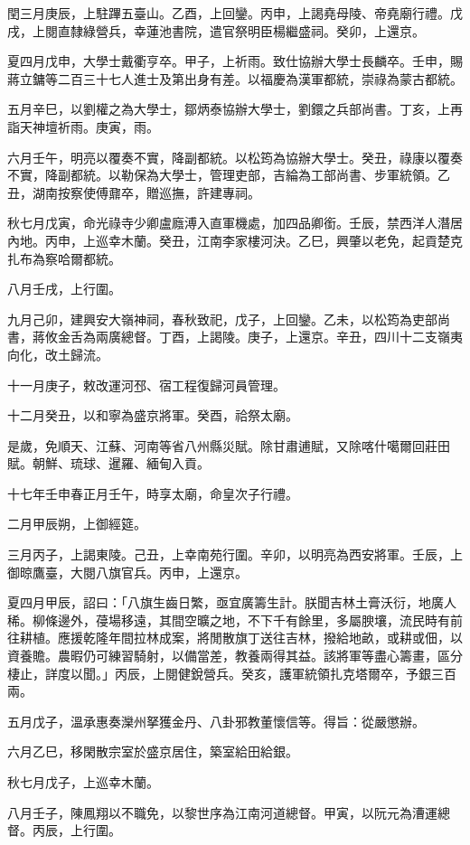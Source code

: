 \begin{pinyinscope}
閏三月庚辰，上駐蹕五臺山。乙酉，上回鑾。丙申，上謁堯母陵、帝堯廟行禮。戊戌，上閱直隸綠營兵，幸蓮池書院，遣官祭明臣楊繼盛祠。癸卯，上還京。

夏四月戊申，大學士戴衢亨卒。甲子，上祈雨。致仕協辦大學士長麟卒。壬申，賜蔣立鏞等二百三十七人進士及第出身有差。以福慶為漢軍都統，崇祿為蒙古都統。

五月辛巳，以劉權之為大學士，鄒炳泰協辦大學士，劉鐶之兵部尚書。丁亥，上再詣天神壇祈雨。庚寅，雨。

六月壬午，明亮以覆奏不實，降副都統。以松筠為協辦大學士。癸丑，祿康以覆奏不實，降副都統。以勒保為大學士，管理吏部，吉綸為工部尚書、步軍統領。乙丑，湖南按察使傅鼐卒，贈巡撫，許建專祠。

秋七月戊寅，命光祿寺少卿盧廕溥入直軍機處，加四品卿銜。壬辰，禁西洋人潛居內地。丙申，上巡幸木蘭。癸丑，江南李家樓河決。乙巳，興肇以老免，起貢楚克扎布為察哈爾都統。

八月壬戌，上行圍。

九月己卯，建興安大嶺神祠，春秋致祀，戊子，上回鑾。乙未，以松筠為吏部尚書，蔣攸金舌為兩廣總督。丁酉，上謁陵。庚子，上還京。辛丑，四川十二支嶺夷向化，改土歸流。

十一月庚子，敕改運河邳、宿工程復歸河員管理。

十二月癸丑，以和寧為盛京將軍。癸酉，祫祭太廟。

是歲，免順天、江蘇、河南等省八州縣災賦。除甘肅逋賦，又除喀什噶爾回莊田賦。朝鮮、琉球、暹羅、緬甸入貢。

十七年壬申春正月壬午，時享太廟，命皇次子行禮。

二月甲辰朔，上御經筵。

三月丙子，上謁東陵。己丑，上幸南苑行圍。辛卯，以明亮為西安將軍。壬辰，上御晾鷹臺，大閱八旗官兵。丙申，上還京。

夏四月甲辰，詔曰：「八旗生齒日繁，亟宜廣籌生計。朕聞吉林土膏沃衍，地廣人稀。柳條邊外，葠場移遠，其間空曠之地，不下千有餘里，多屬腴壤，流民時有前往耕植。應援乾隆年間拉林成案，將閒散旗丁送往吉林，撥給地畝，或耕或佃，以資養贍。農暇仍可練習騎射，以備當差，教養兩得其益。該將軍等盡心籌畫，區分棲止，詳度以聞。」丙辰，上閱健銳營兵。癸亥，護軍統領扎克塔爾卒，予銀三百兩。

五月戊子，溫承惠奏灤州拏獲金丹、八卦邪教董懷信等。得旨：從嚴懲辦。

六月乙巳，移閑散宗室於盛京居住，築室給田給銀。

秋七月戊子，上巡幸木蘭。

八月壬子，陳鳳翔以不職免，以黎世序為江南河道總督。甲寅，以阮元為漕運總督。丙辰，上行圍。


\end{pinyinscope}

